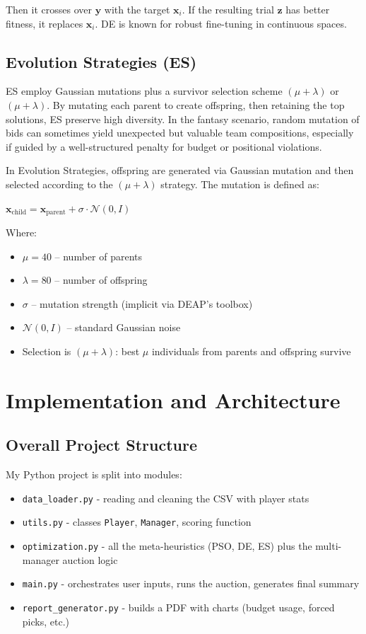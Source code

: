 \documentclass[sigconf]{acmart}
\begin{document}
	Then it crosses over $\mathbf{y}$ with the target $\mathbf{x}_i$. If the resulting trial $\mathbf{z}$ has better fitness, it replaces $\mathbf{x}_i$. DE is known for robust fine-tuning in continuous spaces.
	
	\subsection{Evolution Strategies (ES)}
	ES employ Gaussian mutations plus a survivor selection scheme $(\mu+\lambda)$ or $(\mu+\lambda)$. By mutating each parent to create offspring, then retaining the top solutions, ES preserve high diversity. In the fantasy scenario, random mutation of bids can sometimes yield unexpected but valuable team compositions, especially if guided by a well-structured penalty for budget or positional violations.
	
	In Evolution Strategies, offspring are generated via Gaussian mutation and then selected according to the $(\mu + \lambda)$ strategy. The mutation is defined as:
	
	$
	\mathbf{x}_{\text{child}} = \mathbf{x}_{\text{parent}} + \sigma \cdot \mathcal{N}(0, I)
	$
	
	Where:
	\begin{itemize}
		\item $\mu = 40$ – number of parents
		\item $\lambda = 80$ – number of offspring
		\item $\sigma$ – mutation strength (implicit via DEAP's toolbox)
		\item $\mathcal{N}(0, I)$ – standard Gaussian noise
		\item Selection is $(\mu + \lambda)$: best $\mu$ individuals from parents and offspring survive
	\end{itemize}
	
	
	\section{Implementation and Architecture}
	\label{sec:implementation}
	
	\subsection{Overall Project Structure}
	My Python project is split into modules:
	\begin{itemize}
		\item \texttt{data\_loader.py} - reading and cleaning the CSV with player stats
		\item \texttt{utils.py} - classes \texttt{Player}, \texttt{Manager}, scoring function
		\item \texttt{optimization.py} - all the meta-heuristics (PSO, DE, ES) plus the multi-manager auction logic
		\item \texttt{main.py} - orchestrates user inputs, runs the auction, generates final summary
		\item \texttt{report\_generator.py} - builds a PDF with charts (budget usage, forced picks, etc.)
	\end{itemize}
	
\end{document}
